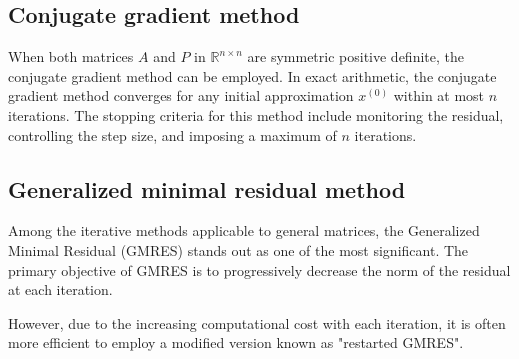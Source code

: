 \subsection*{Conjugate gradient method}
When both matrices $A$ and $P$ in $\mathbb{R}^{n \times n}$ are symmetric positive definite, the conjugate gradient method can be employed.
In exact arithmetic, the conjugate gradient method converges for any initial approximation $x^{(0)}$ within at most $n$ iterations.
The stopping criteria for this method include monitoring the residual, controlling the step size, and imposing a maximum of $n$ iterations.

\subsection*{Generalized minimal residual method}
Among the iterative methods applicable to general matrices, the Generalized Minimal Residual (GMRES) stands out as one of the most significant. 
The primary objective of GMRES is to progressively decrease the norm of the residual at each iteration.

However, due to the increasing computational cost with each iteration, it is often more efficient to employ a modified version known as "restarted GMRES". 